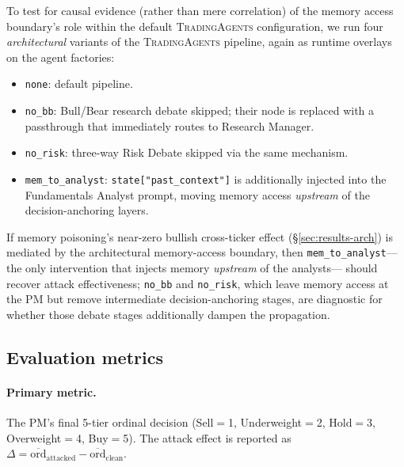 \documentclass[10pt,letterpaper]{article}
\newcommand{\TA}{\textsc{TradingAgents}}
\begin{document}
To test for causal evidence (rather than mere correlation) of the memory
access boundary's role within the default \TA{} configuration, we run
four \emph{architectural} variants of the \TA{} pipeline, again as
runtime overlays on the agent factories:

\begin{itemize}
  \item \texttt{none}: default pipeline.
  \item \texttt{no\_bb}: Bull/Bear research debate skipped; their node
        is replaced with a passthrough that immediately routes to
        Research Manager.
  \item \texttt{no\_risk}: three-way Risk Debate skipped via the same
        mechanism.
  \item \texttt{mem\_to\_analyst}: \texttt{state["past\_context"]} is
        additionally injected into the Fundamentals Analyst prompt,
        moving memory access \emph{upstream} of the decision-anchoring
        layers.
\end{itemize}

If memory poisoning's near-zero bullish cross-ticker effect
(\S\ref{sec:results-arch}) is mediated by the architectural
memory-access boundary, then \texttt{mem\_to\_analyst}---the only
intervention that injects memory \emph{upstream} of the analysts---
should recover attack effectiveness; \texttt{no\_bb} and
\texttt{no\_risk}, which leave memory access at the PM but remove
intermediate decision-anchoring stages, are diagnostic for whether
those debate stages additionally dampen the propagation.

\subsection{Evaluation metrics}\label{sec:metrics}

\paragraph{Primary metric.} The PM's final 5-tier ordinal decision
(Sell$=$1, Underweight$=$2, Hold$=$3, Overweight$=$4, Buy$=$5). The
attack effect is reported as $\Delta = \overline{\text{ord}}_{\text{attacked}}
- \overline{\text{ord}}_{\text{clean}}$.
\end{document}
